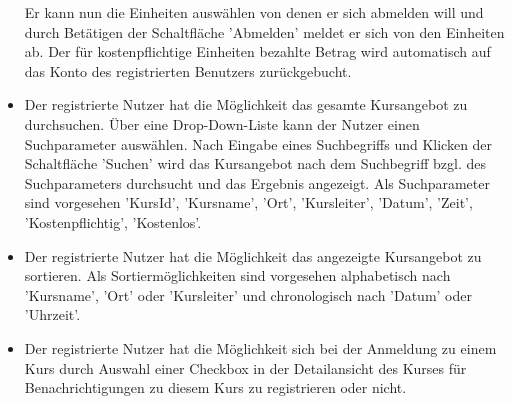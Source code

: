 \documentclass[a4paper]{scrreprt}
\begin{document}
\begin{itemize}
					Er kann nun die Einheiten auswählen von denen er sich abmelden will und durch Betätigen der Schaltfläche 'Abmelden' meldet er sich von den Einheiten ab. Der für kostenpflichtige Einheiten bezahlte Betrag wird automatisch auf das Konto des registrierten Benutzers zurückgebucht.
				\item {}
					Der registrierte Nutzer hat die Möglichkeit das gesamte Kursangebot zu durchsuchen. Über eine Drop-Down-Liste kann der Nutzer einen Suchparameter auswählen. Nach Eingabe eines Suchbegriffs und Klicken der Schaltfläche 'Suchen' wird das Kursangebot nach dem Suchbegriff bzgl. des Suchparameters durchsucht und das Ergebnis angezeigt. 
					Als Suchparameter sind vorgesehen 'KursId', 'Kursname', 'Ort', 'Kursleiter', 'Datum', 'Zeit', 'Kostenpflichtig', 'Kostenlos'.
				\item {}
					Der registrierte Nutzer hat die Möglichkeit das angezeigte Kursangebot zu sortieren. Als Sortiermöglichkeiten sind vorgesehen alphabetisch nach 'Kursname', 'Ort' oder 'Kursleiter' und chronologisch nach 'Datum' oder 'Uhrzeit'.
				\item {}
					Der registrierte Nutzer hat die Möglichkeit sich bei der Anmeldung zu einem Kurs durch Auswahl einer Checkbox in der Detailansicht des Kurses für Benachrichtigungen zu diesem Kurs zu registrieren oder nicht.
			\end{itemize}
\end{document}
